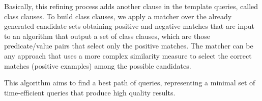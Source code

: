 Basically, this refining process adds another clause in the template queries, called class clauses. To build class clauses, we apply a matcher over the already generated candidate sets obtaining positive and negative matches that are input to an algorithm that output a set of class clauses, which are those predicate/value pairs that select only the positive matches.  The matcher can be any approach that uses a more complex similarity measure to select the correct matches (positive examples) among the possible candidates. 

This algorithm aims to find a best path of queries, representing a minimal set of time-efficient queries that produce high quality results.



 



